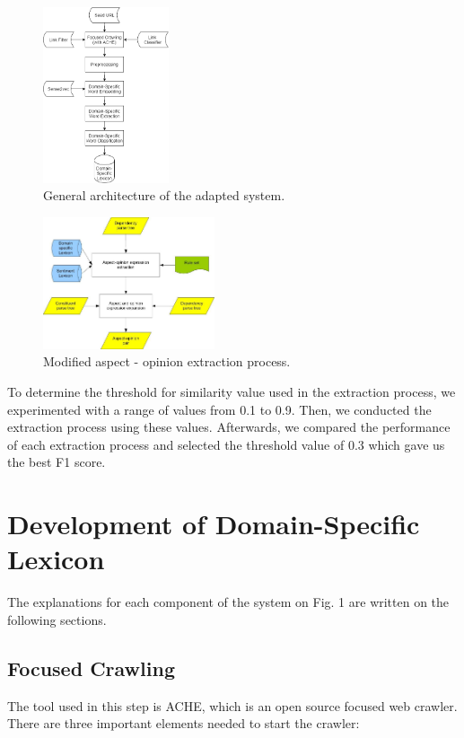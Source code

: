\documentclass[a4paper,conference]{IEEEtran}
\begin{document}
\begin{figure}[htbp]
\centerline{\includegraphics[width=0.33\textwidth]{fig1.png}}
\caption{General architecture of the adapted system.}
\label{fig1}
\end{figure}

\begin{figure}[htbp]
\centerline{\includegraphics[width=0.45\textwidth]{fig2.jpg}}
\caption{Modified aspect - opinion extraction process.}
\label{fig2}
\end{figure}

To determine the threshold for similarity value used in the extraction process, we experimented with a range of values from 0.1 to 0.9. Then, we conducted the extraction process using these values. Afterwards, we compared the performance of each extraction process and selected the threshold value of 0.3 which gave us the best F1 score.

\section{Development of Domain-Specific Lexicon}
The explanations for each component of the system on Fig. 1 are written on the following sections.

\subsection{Focused Crawling}
The tool used in this step is ACHE, which is an open source focused web crawler. There are three important elements needed to start the crawler:
\end{document}
